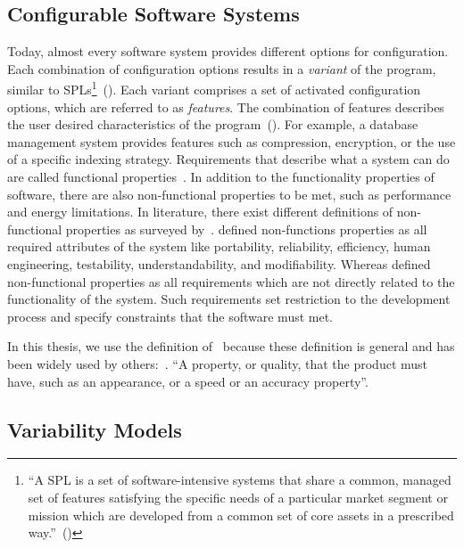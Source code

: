\subsection{Configurable Software Systems}
\label{background_conf_sys}
Today, almost every software system provides different options for configuration. 
Each combination of configuration options results in a \textit{variant} of the program, similar to \acp{SPL}\footnote{``A \ac{SPL} is a set of software-intensive systems that share a common, managed set of features satisfying the specific needs of a particular market segment or mission which are developed from a common set of core assets in a prescribed way.''~(\cite{northrop2010spl})}~(\cite{siegmund2012spl}). 
Each variant comprises a set of activated configuration options, which are referred to as \textit{features}. 
The combination of features describes the user desired characteristics of the program~(\cite{czarnecki2000generative}).
For example, a database management system provides features such as compression, encryption, or the use of a specific indexing strategy.
Requirements that describe what a system can do are called functional properties~\cite{chung1995using}. 
In addition to the functionality properties of software, there are also non-functional properties to be met, such as performance and energy limitations.
In literature, there exist different definitions of non-functional properties as surveyed by~\cite{glinz2007non}. \cite{davis1993software} defined non-functions properties as all required attributes of the system like portability, reliability, efficiency, human engineering, testability, understandability, and modifiability. Whereas \cite{kotonya1998requirements} defined non-functional properties as all requirements which are not directly related to the functionality of the system. Such requirements set restriction to the development process and specify constraints that the software must met.

In this thesis, we use the definition of~\cite{robertson1999mastering} because these definition is general and has been widely used by others:~\cite{nuseibeh2000requirements,jackson2001problem,cohn2004user,siegmund2012spl}. ``A property, or quality, that the product must have, such as an appearance, or a speed or an accuracy property''.

\subsection{Variability Models}
\label{background_variab_models}

